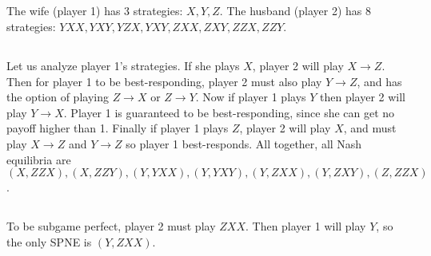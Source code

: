\documentclass{article}
\begin{document}
\subsection{}
The wife (player 1) has 3 strategies: $X,Y,Z$. The husband (player 2) has 8 strategies: $YXX, YXY, YZX, YXY, ZXX, ZXY, ZZX, ZZY$.

\subsection{}
Let us analyze player 1's strategies. If she plays $X$, player 2 will play $X\rightarrow Z$. Then for player 1 to be best-responding, player 2 must also play $Y\rightarrow Z$, and has the option of playing $Z\rightarrow X$ or $Z\rightarrow Y$. Now if player 1 plays $Y$ then player 2 will play $Y\rightarrow X$. Player 1 is guaranteed to be best-responding, since she can get no payoff higher than 1. Finally if player 1 plays $Z$, player 2 will play $X$, and must play $X\rightarrow Z$ and $Y\rightarrow Z$ so player 1 best-responds. All together, all Nash equilibria are $(X,ZZX), (X,ZZY), (Y,YXX), (Y,YXY), (Y,ZXX), (Y,ZXY), (Z,ZZX)$.

\subsection{}
To be subgame perfect, player 2 must play $ZXX$. Then player 1 will play $Y$, so the only SPNE is $(Y,ZXX)$.
\end{document}
